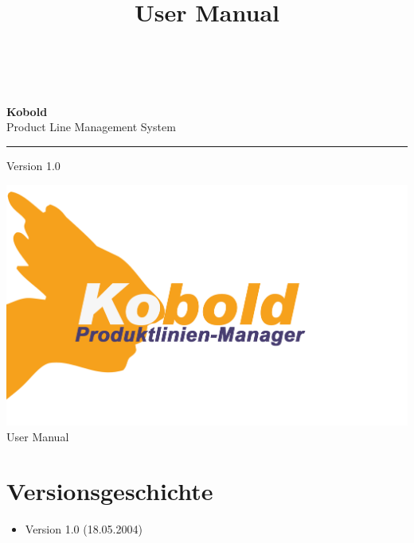 \documentclass[a4paper,titlepage,12pt,ngerman]{scrbook}
\title {\huge \product\\[0.5cm]\large User Manual \\[0.5cm] \version
  \\[1cm] \Large \company}
\newcommand\version{Version 1.0\xspace}
\begin{document}

\begin{titlepage}
\renewcommand{\thefootnote}{\fnsymbol{footnote}}
{\Huge
\raggedright
\textbf{\bf Kobold} \\
\huge Product Line Management System
\rule{\textwidth}{0.75pt}
\par
}
\begin{flushleft}
\normalsize
\version
\end{flushleft}


\vfill
\includegraphics[width=15cm]{../common/logo-color.png}
\vfill
{\parindent=0cm
\Huge User Manual
}


\setcounter{footnote}{0}
\end{titlepage}


\section*{Versionsgeschichte}

\begin{itemize}

\item Version 1.0 (18.05.2004)

\end{itemize}

\tableofcontents







\end{document}
